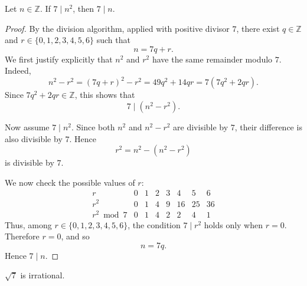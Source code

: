 \begin{lemma}\label{lem:divisibility}
  Let \(n \in \mathbb{Z}\). If \(7 \mid n^2\), then \(7 \mid n\).
\end{lemma}

\begin{proof}
  By the division algorithm, applied with positive divisor \(7\), there exist
  \(q \in \mathbb{Z}\) and \(r \in \{0,1,2,3,4,5,6\}\) such that
  \[
    n = 7q + r.
  \]
  We first justify explicitly that \(n^2\) and \(r^2\) have the same remainder
  modulo \(7\). Indeed,
  \[
    n^2 - r^2 = (7q+r)^2 - r^2
    = 49q^2 + 14qr
    = 7(7q^2+2qr).
  \]
  Since \(7q^2+2qr \in \mathbb{Z}\), this shows that
  \[
    7 \mid (n^2-r^2).
  \]

  Now assume \(7 \mid n^2\). Since both \(n^2\) and \(n^2-r^2\) are divisible
  by \(7\), their difference is also divisible by \(7\). Hence
  \[
    r^2 = n^2 - (n^2-r^2)
  \]
  is divisible by \(7\).

  We now check the possible values of \(r\):
  \[
  \begin{array}{c|ccccccc}
    r & 0 & 1 & 2 & 3 & 4 & 5 & 6 \\
    \hline
    r^2 & 0 & 1 & 4 & 9 & 16 & 25 & 36 \\
    r^2 \bmod 7 & 0 & 1 & 4 & 2 & 2 & 4 & 1
  \end{array}
  \]
  Thus, among \(r \in \{0,1,2,3,4,5,6\}\), the condition \(7 \mid r^2\) holds
  only when \(r=0\). Therefore \(r=0\), and so
  \[
    n = 7q.
  \]
  Hence \(7 \mid n\).
\end{proof}

\begin{theorem}\label{thm:sqrt7}
  \(\sqrt{7}\) is irrational.
\end{theorem}

